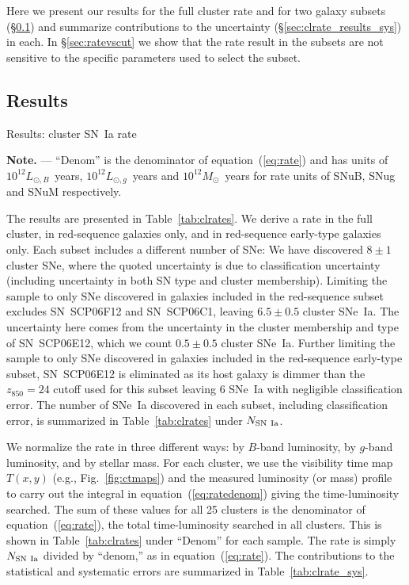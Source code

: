 
Here we present our results for the full cluster rate and for two
galaxy subsets (\S\ref{sec:clrate_results_results}) and summarize
contributions to the uncertainty (\S\ref{sec:clrate_results_sys}) in
each. In \S\ref{sec:ratevscut} we show that the rate result in the subsets
are not sensitive to the specific parameters used to select the
subset.

\subsection{Results} \label{sec:clrate_results_results}

\begin{table}
\caption{\label{tab:clrates}Results: cluster SN~Ia rate}
\begin{center}

\end{center}
{\footnotesize
{\bf Note.} --- ``Denom'' is the denominator of
equation~(\ref{eq:rate}) and has units of $10^{12} L_{\odot,B}$~years,
$10^{12} L_{\odot,g}$~years and $10^{12} M_\odot$~years for rate units
of SNuB, SNug and SNuM respectively.}
\end{table}

The results are presented in Table~\ref{tab:clrates}.  We derive a
rate in the full cluster, in red-sequence galaxies only, and in
red-sequence early-type galaxies only. Each subset includes a
different number of SNe: We have discovered $8 \pm 1$ cluster SNe,
where the quoted uncertainty is due to classification uncertainty
(including uncertainty in both SN type and cluster membership).
Limiting the sample to only SNe discovered in galaxies included in the
red-sequence subset excludes SN~SCP06F12 and SN~SCP06C1, leaving
$6.5 \pm 0.5$ cluster SNe~Ia. The uncertainty here comes from the
uncertainty in the cluster membership and type of SN~SCP06E12, which
we count $0.5 \pm 0.5$ cluster SNe~Ia.  Further limiting the sample to
only SNe discovered in galaxies included in the red-sequence
early-type subset, SN~SCP06E12 is eliminated as its host galaxy is
dimmer than the $z_{850} = 24$ cutoff used for this subset leaving $6$
SNe~Ia with negligible classification error. The number of SNe~Ia
discovered in each subset, including classification error, is
summarized in Table~\ref{tab:clrates} under $N_{\rm SN~Ia}$.

We normalize the rate in three different ways: by $B$-band luminosity,
by $g$-band luminosity, and by stellar mass.  For each cluster, we use
the visibility time map $T(x,y)$ (e.g., Fig.~\ref{fig:ctmaps}) and the
measured luminosity (or mass) profile to carry out the integral in
equation~(\ref{eq:ratedenom}) giving the time-luminosity searched. The
sum of these values for all 25 clusters is the denominator of
equation~(\ref{eq:rate}), the total time-luminosity searched in all
clusters. This is shown in Table~\ref{tab:clrates} under ``Denom''
for each sample. The rate is simply $N_{\rm SN~Ia}$ divided by
``denom,'' as in equation~(\ref{eq:rate}). The contributions to the
statistical and systematic errors are summarized in
Table~\ref{tab:clrate_sys}.


